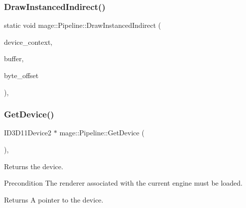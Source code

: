 \hypertarget{structmage_1_1_pipeline_aa3b1e4b3ab6f3ea3dba6218dbb08bc4f}{}\label{structmage_1_1_pipeline_aa3b1e4b3ab6f3ea3dba6218dbb08bc4f} 
\subsubsection{\texorpdfstring{Draw\+Instanced\+Indirect()}{DrawInstancedIndirect()}}
{\footnotesize\ttfamily static void mage\+::\+Pipeline\+::\+Draw\+Instanced\+Indirect (\begin{DoxyParamCaption}\item[{I\+D3\+D11\+Device\+Context2 $\ast$}]{device\+\_\+context,  }\item[{I\+D3\+D11\+Buffer $\ast$}]{buffer,  }\item[{\hyperlink{namespacemage_af2b398bf98eb10351f49cad73fe2cc73}{u32}}]{byte\+\_\+offset }\end{DoxyParamCaption})\hspace{0.3cm}{\ttfamily [static]}, {\ttfamily [noexcept]}}

\hypertarget{structmage_1_1_pipeline_a5ee450d9d2a1dc333c7491a13376dca3}{}\label{structmage_1_1_pipeline_a5ee450d9d2a1dc333c7491a13376dca3} 
\subsubsection{\texorpdfstring{Get\+Device()}{GetDevice()}}
{\footnotesize\ttfamily I\+D3\+D11\+Device2 $\ast$ mage\+::\+Pipeline\+::\+Get\+Device (\begin{DoxyParamCaption}{ }\end{DoxyParamCaption})\hspace{0.3cm}{\ttfamily [static]}, {\ttfamily [noexcept]}}

Returns the device.

\begin{DoxyPrecond}{Precondition}
The renderer associated with the current engine must be loaded. 
\end{DoxyPrecond}
\begin{DoxyReturn}{Returns}
A pointer to the device. 
\end{DoxyReturn}
\hypertarget{structmage_1_1_pipeline_af3a32798924091ccd874121889338163}{}\label{structmage_1_1_pipeline_af3a32798924091ccd874121889338163} 
